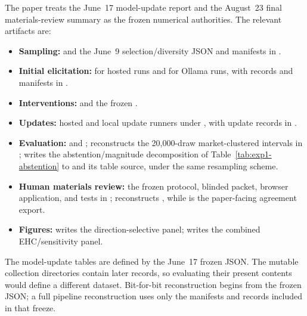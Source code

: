 The paper treats the June~17 model-update report and the August~23 final
materials-review summary as the frozen numerical authorities. The relevant
artifacts are:

\begin{itemize}
  \item \textbf{Sampling:}
         and the June~9
        selection/diversity JSON and manifests in
        .
  \item \textbf{Initial elicitation:}
         for hosted runs and
         for Ollama runs, with
        records and manifests in .
  \item \textbf{Interventions:}
         and the frozen
        .
  \item \textbf{Updates:}
        hosted and local update runners under , with
        update records in .
  \item \textbf{Evaluation:}
         and
        ;
        reconstructs the 20,000-draw market-clustered intervals in
        ;
         writes the
        abstention/magnitude decomposition of Table~\ref{tab:exp1-abstention} to
         and its
        table source, under the same resampling scheme.
  \item \textbf{Human materials review:}
        the frozen protocol, blinded packet, browser application, and tests in
        ;
         reconstructs
        , while
         is the paper-facing agreement
        export.
  \item \textbf{Figures:}
         writes the direction-selective panel;
         writes the combined
        EHC/sensitivity panel.
\end{itemize}

The model-update tables are defined by the June~17 frozen JSON. The mutable collection
directories contain later records, so evaluating their present contents would
define a different dataset. Bit-for-bit reconstruction begins from the frozen
JSON; a full pipeline reconstruction uses only the manifests and records included
in that freeze.
